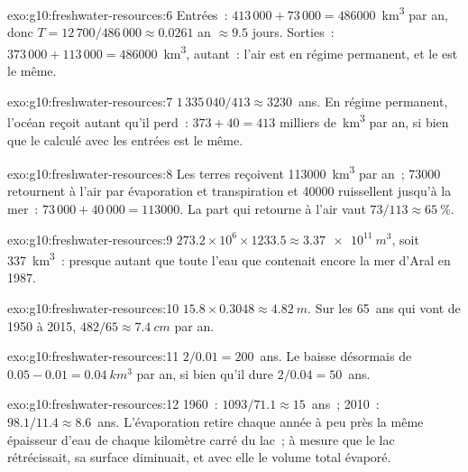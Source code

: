 \begin{solution}{exo:g10:freshwater-resources:6}
Entrées~: $413\,000 + 73\,000 = \num{486000}$~\unit{km^3} par an, donc
$T = 12\,700/486\,000 \approx \num{0.0261}$ an $\approx \num{9.5}$ jours.
Sorties~: $373\,000 + 113\,000 = \num{486000}$~\unit{km^3}, autant~: l'air
est en régime permanent, et le  est le même.
\end{solution}

\begin{solution}{exo:g10:freshwater-resources:7}
$1\,335\,040/413 \approx \num{3230}$~ans. En régime permanent, l'océan
reçoit autant qu'il perd~: $373 + 40 = 413$ milliers de~\unit{km^3} par an,
si bien que le  calculé avec les entrées est le même.
\end{solution}

\begin{solution}{exo:g10:freshwater-resources:8}
Les terres reçoivent \num{113000}~\unit{km^3} par an~; \num{73000}
retournent à l'air par évaporation et transpiration et \num{40000}
ruissellent jusqu'à la mer~: $73\,000 + 40\,000 = \num{113000}$. La part
qui retourne à l'air vaut
$73/113 \approx \qty{65}{\percent}$.
\end{solution}

\begin{solution}{exo:g10:freshwater-resources:9}
$273.2 \times 10^6 \times 1233.5 \approx \qty{3.37e11}{m^3}$, soit
\qty{337}{km^3}~: presque autant que toute l'eau que contenait encore la mer
d'Aral en 1987.
\end{solution}

\begin{solution}{exo:g10:freshwater-resources:10}
$15.8 \times 0.3048 \approx \qty{4.82}{m}$. Sur les 65~ans qui vont de 1950
à 2015, $482/65 \approx \qty{7.4}{cm}$ par an.
\end{solution}

\begin{solution}{exo:g10:freshwater-resources:11}
$2/0.01 = 200$~ans. Le  baisse désormais de $0.05 - 0.01 =
\qty{0.04}{km^3}$ par an, si bien qu'il dure $2/0.04 = 50$~ans.
\end{solution}

\begin{solution}{exo:g10:freshwater-resources:12}
1960~: $1093/71.1 \approx 15$~ans~; 2010~: $98.1/11.4 \approx 8.6$~ans.
L'évaporation retire chaque année à peu près la même épaisseur d'eau de
chaque kilomètre carré du lac~; à mesure que le lac rétrécissait, sa
surface diminuait, et avec elle le volume total évaporé.
\end{solution}

